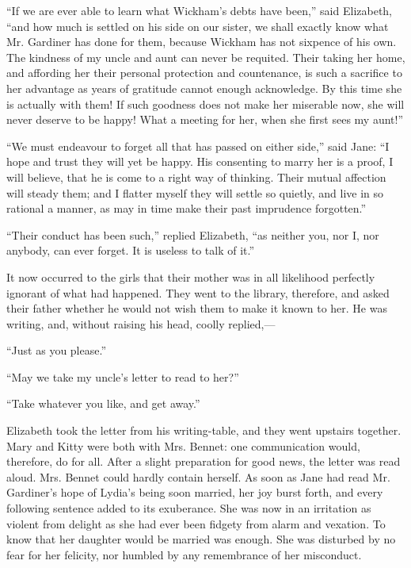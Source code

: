``If we are ever able to learn what Wickham's debts have been,'' said Elizabeth, ``and how much is settled on his side on our sister, we shall exactly know what Mr. Gardiner has done for them, because Wickham has not sixpence of his own. The kindness of my uncle and aunt can never be requited. Their taking her home, and affording her their personal protection and countenance, is such a sacrifice to her advantage as years of gratitude cannot enough acknowledge. By this time she is actually with them! If such goodness does not make her miserable now, she will never deserve to be happy! What a meeting for her, when she first sees my aunt!''

``We must endeavour to forget all that has passed on either side,'' said Jane: ``I hope and trust they will yet be happy. His consenting to marry her is a proof, I will believe, that he is come to a right way of thinking. Their mutual affection will steady them; and I flatter myself they will settle so quietly, and live in so rational a manner, as may in time make their past imprudence forgotten.''

``Their conduct has been such,'' replied Elizabeth, ``as neither you, nor I, nor anybody, can ever forget. It is useless to talk of it.''

It now occurred to the girls that their mother was in all likelihood perfectly ignorant of what had happened. They went to the library, therefore, and asked their father whether he would not wish them to make it known to her. He was writing, and, without raising his head, coolly replied,---

``Just as you please.''

``May we take my uncle's letter to read to her?''

``Take whatever you like, and get away.''

Elizabeth took the letter from his writing-table, and they went upstairs together. Mary and Kitty were both with Mrs. Bennet: one communication would, therefore, do for all. After a slight preparation for good news, the letter was read aloud. Mrs. Bennet could hardly contain herself. As soon as Jane had read Mr. Gardiner's hope of Lydia's being soon married, her joy burst forth, and every following sentence added to its exuberance. She was now in an irritation as violent from delight as she had ever been fidgety from alarm and vexation. To know that her daughter would be married was enough. She was disturbed by no fear for her felicity, nor humbled by any remembrance of her misconduct.

